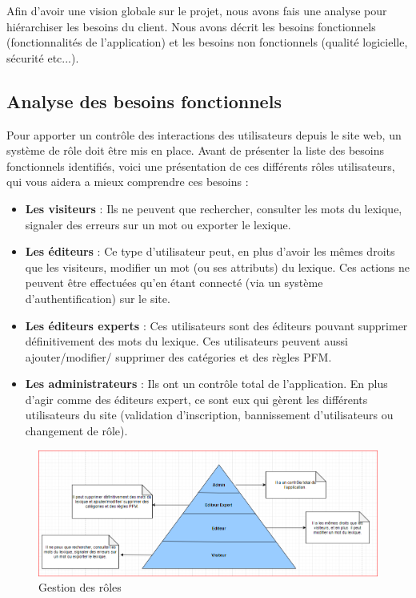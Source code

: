 \documentclass[12pt,a4paper]{article}
\begin{document}
    Afin d'avoir une vision globale sur le projet, nous avons fais une analyse pour hiérarchiser les besoins du client.
    Nous avons décrit les besoins fonctionnels (fonctionnalités de l'application) et les besoins non fonctionnels (qualité logicielle, sécurité etc...).

    \subsection{Analyse des besoins fonctionnels}

    Pour apporter un contrôle des interactions des utilisateurs depuis le site web, un système de rôle doit être mis en place. Avant de présenter la liste des besoins fonctionnels identifiés, voici une présentation de ces différents rôles utilisateurs, qui vous aidera a mieux comprendre ces besoins :
    \begin{itemize}
        \item \textbf{Les visiteurs} : Ils ne peuvent que rechercher, consulter les mots du lexique, signaler des erreurs sur un mot ou exporter le lexique.
        \item \textbf{Les éditeurs} : Ce type d'utilisateur peut, en plus d'avoir les mêmes droits que les visiteurs, modifier un mot (ou ses attributs) du lexique. Ces actions ne peuvent être effectuées qu'en étant connecté (via un système d'authentification) sur le site.
        \item \textbf{Les éditeurs experts} : Ces utilisateurs sont des éditeurs pouvant supprimer définitivement des mots du lexique. Ces utilisateurs peuvent aussi ajouter/modifier/ supprimer des catégories et des règles PFM.
        \item \textbf{Les administrateurs} : Ils ont un contrôle total de l'application. En plus d'agir comme des éditeurs expert, ce sont eux qui gèrent les différents utilisateurs du site (validation d'inscription, bannissement d'utilisateurs ou changement de rôle).
    \end{itemize}

    \smallbreak

    \begin{figure}[h]
        \centering
        \includegraphics[width=150mm]{img/role.PNG}
        \caption{Gestion des rôles}
        \label{Tux}
    \end{figure}
\end{document}
